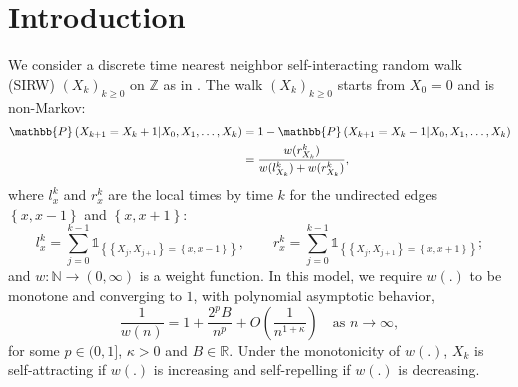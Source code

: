 \documentclass[EJP]{ejpecp} %
\begin{document}


	\section{Introduction}

We consider a discrete time nearest neighbor self-interacting random walk (SIRW) $(X_k)_{k\geq 0}$ on $\mathbb{Z}$ as in \cite{T96,KMP23}. The walk $(X_k)_{k\geq 0}$ starts from $X_0 = 0$ and is non-Markov:
\begin{align}
	\mathbb{P}\left( X_{k+1} =  X_k+1 \middle| X_0, X_1,\dots, X_k   \right) 
	&=1- \mathbb{P}\left( X_{k+1} =  X_k-1 \middle| X_0, X_1,\dots, X_k   \right)  
	\notag
	\\
	&=  \frac{  w(r_{X_k}^k)}{ w(l_{X_k}^k)  + w(r_{X_k}^k)   }
	, \label{eq: dynamic}
\end{align}
where $l_x^k$ and $r_x^k$ are the local times by time $k$ for the undirected edges $\left\{x,x-1\right\}$ and $\left\{x,x+1\right\}$:
\[ 
l_x^k = \sum_{j=0}^{k-1} \mathbb{1}_{ \left\{  \left\{X_j, X_{j+1}\right\} =  \left\{x,x-1\right\} \right\} }, \qquad
r_x^k = \sum_{j=0}^{k-1} \mathbb{1}_{ \left\{  \left\{X_j, X_{j+1}\right\} =  \left\{x,x+1\right\} \right\} }   
;\]
and $
w: \mathbb{N} \to  (0, \infty )
$ 
is a weight function.
In this model, we require $w(.)$ to be monotone and converging to $1$, with polynomial asymptotic behavior,
\begin{equation}\label{eq: asymptotics of w}
	\frac{1}{w(n)} = 1 + \frac{2^p B}{n^p} + O\left(\frac{1}{n^{1+\mathcal{\kappa}}}\right) \quad \mbox{as $n\to \infty$}, 	
\end{equation} 
for some $p \in (0,1]$, $\kappa>0$ and $B\in \mathbb{R}$. Under the monotonicity of $w(.)$, $X_k$ is self-attracting if $w(.)$ is increasing and self-repelling if $w(. )$ is decreasing.
\end{document}
